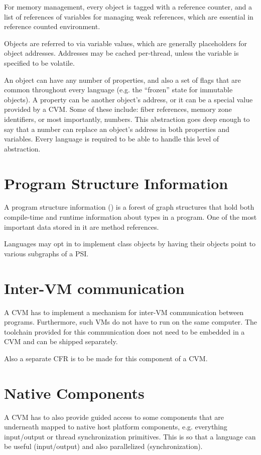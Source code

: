 For memory management, every object is tagged with a reference counter, and a list of references of variables for managing weak references, which are essential in reference counted environment. 

Objects are referred to via variable values, which are generally placeholders for object addresses. Addresses may be cached per-thread, unless the variable is specified to be volatile. 

An object can have any number of properties, and also a set of flags that are common throughout every language (e.g. the ``frozen'' state for immutable objects). A property can be another object's address, or it can be a special value provided by a CVM. Some of these include: fiber references, memory zone identifiers, or most importantly, numbers. This abstraction goes deep enough to say that a number can replace an object's address in both properties and variables. Every language is required to be able to handle this level of abstraction. 






\section{Program Structure Information}
\label{sec:psi}

A program structure information () is a forest of graph structures that hold both compile-time and runtime information about types in a program. One of the most important data stored in it are method references. 

Languages may opt in to implement class objects by having their objects point to various subgraphs of a PSI. 





\section{Inter-VM communication} %

A CVM has to implement a mechanism for inter-VM communication between programs. Furthermore, such VMs do not have to run on the same computer. The toolchain provided for this communication does not need to be embedded in a CVM and can be shipped separately. 

Also a separate CFR is to be made for this component of a CVM. 





\section{Native Components} %

A CVM has to also provide guided access to some components that are underneath mapped to native host platform components, e.g. everything input/output or thread synchronization primitives. This is so that a language can be useful (input/output) and also parallelized (synchronization). 





